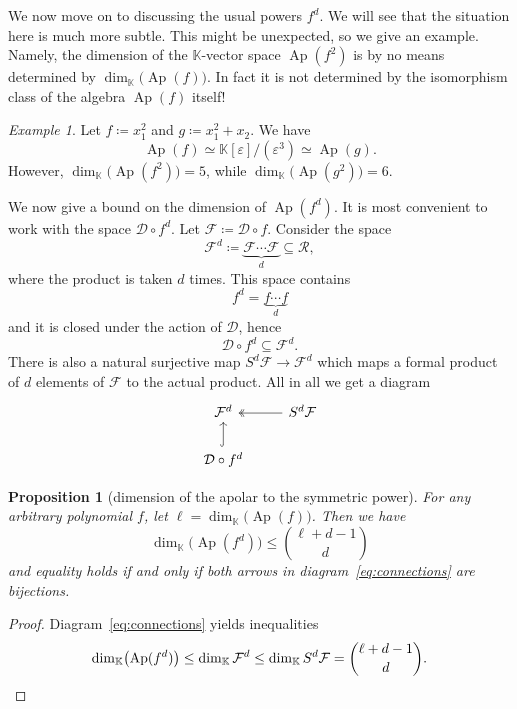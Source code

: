 \documentclass[a4paper,11pt,reqno]{amsart}
\newcommand{\calD}{\mathcal{D}}
\newcommand{\calF}{\mathcal{F}}
\newcommand{\calR}{\mathcal{R}}
\newcommand{\bbK}{\mathbb{K}}
\DeclareMathOperator{\Ap}{Ap}
\numberwithin{equation}{section}
\theoremstyle{definition}
\theoremstyle{plain}
\newtheorem{prop}[defn]{Proposition}
\theoremstyle{remark}
\newtheorem{exam}[defn]{Example}
\begin{document}
We now move on to discussing the usual powers $f^d$.
We will see that the situation here is much more
subtle. This {might be} unexpected, so we give an example. Namely, the
dimension of the $\bbK$-vector space
$\Ap(f^2)$ is by no means determined by $\dim_{\bbK}\bigl(\Ap(f)\bigr)$. In fact it is not
determined by the isomorphism class of the algebra $\Ap(f)$ itself!
\begin{exam}\label{ex:varyingDegreeOfSquare}
    Let $f \coloneq x_1^2$ and $g \coloneq x_1^2 + x_2$. We have \[\Ap(f) \simeq
    \bbK[\varepsilon]/(\varepsilon^3) \simeq \Ap(g).\] However, $\dim_{\bbK}\bigl( \Ap(f^2)\bigr)
    = 5$, while $\dim_{\bbK}\bigl( \Ap(g^2)\bigr) = 6$.
\end{exam}
We now give a bound on the dimension of $\Ap(f^d)$. It is most convenient to
work with the space $\calD \circ f^d$. Let $\calF \coloneqq \calD\circ f$.
Consider the space
{\[\calF^{d} \coloneqq \underbrace{\calF\cdots  \calF}_d \subseteq \calR,\]}
where
the product is taken $d$ times. This space contains
 \[f^d = \underbrace{f\cdots f}_d\]
 and it is closed under the action of $\calD$, hence
 \begin{equation}\label{eq:containment}
    \calD\circ f^d \subseteq \calF^{d}.
\end{equation}
{There is also} a natural surjective map $S^d\calF\to \calF^{d}$ which maps a formal product
of $d$ elements of $\calF$ to the actual product. All in all we get a
diagram
\begin{equation}\label{eq:connections}
    \begin{tikzcd}
        \calF^{d} & \ar[l, two heads] S^d \calF\\
        \calD\circ f^{d}\ar[u, hook]
    \end{tikzcd}
\end{equation}
\begin{prop}[dimension of the apolar to the symmetric
    power]\label{prop:inequalityOnDuals}
    For any arbitrary polynomial $f$, let $\ell = \dim_{\bbK} \bigl(\Ap(f)\bigr)$. Then we have
    \[
        \dim_{\bbK}\bigl( \Ap(f^{d})\bigr) \leq \binom{\ell+d-1}{d}
    \]
    and equality holds if and only if both arrows in diagram~\eqref{eq:connections}
    are bijections.
\end{prop}
\begin{proof}
    Diagram~\eqref{eq:connections} {yields} inequalities
    \[
        \dim_{\bbK}\bigl(\Ap(f^{d})\bigr) \leq \dim_{\bbK} \calF^d \leq \dim_{\bbK} S^d \calF =
        \binom{\ell+d-1}{d}.\qedhere
    \]
\end{proof}
\end{document}
